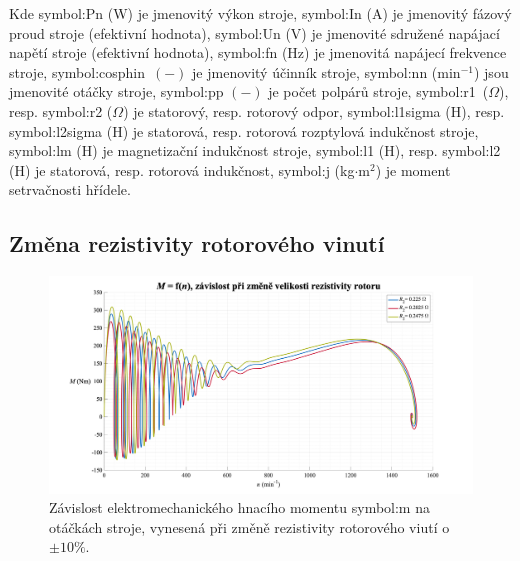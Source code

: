 \documentclass[a4paper, twoside, 11pt]{article}
\newcommand{\fbar}{\FloatBarrier}
\begin{document}
        \vspace*{1cm}
Kde \gls{symbol:Pn} (W) je jmenovitý výkon stroje, \gls{symbol:In} (A) je jmenovitý fázový proud stroje (efektivní hodnota), \gls{symbol:Un} (V) je jmenovité sdružené napájací napětí stroje (efektivní hodnota), \gls{symbol:fn} (Hz) je jmenovitá napájecí frekvence stroje, \gls{symbol:cosphin}~$(-)$ je jmenovitý účinník stroje, \gls{symbol:nn} (min$^{-1}$) jsou jmenovité otáčky stroje, \gls{symbol:pp} $(-)$ je počet polpárů stroje, \gls{symbol:r1}~($\Omega$), resp. \gls{symbol:r2} ($\Omega$) je statorový, resp. rotorový odpor, \gls{symbol:l1sigma} (H), resp. \gls{symbol:l2sigma} (H) je statorová, resp. rotorová rozptylová  indukčnost stroje, \gls{symbol:lm} (H) je magnetizační indukčnost stroje, \gls{symbol:l1} (H), resp. \gls{symbol:l2} (H) je statorová, resp. rotorová indukčnost, \gls{symbol:j} (kg$\cdot$m$^{2}$) je moment setrvačnosti hřídele.\par

\newpage
    \subsection{Změna rezistivity rotorového vinutí}
        \begin{figure}[htbp!]
            \centering
            \includegraphics[width=1\textwidth]{src/png/mh_dyn_nGraphR2.png}
            \caption{Závislost elektromechanického hnacího momentu \gls{symbol:m} na otáčkách stroje, vynesená při změně rezistivity rotorového viutí o~$\pm 10 \%$.}
            \label{fig:mh_dyn_nGraphR2}
        \end{figure}

    \fbar
\end{document}
